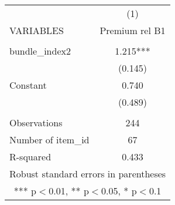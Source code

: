 \documentclass[]{article}
\begin{document}
\begin{tabular}{lc} \hline
 & (1) \\
VARIABLES & Premium rel B1 \\ \hline
 &  \\
bundle\_index2 & 1.215*** \\
 & (0.145) \\
Constant & 0.740 \\
 & (0.489) \\
 &  \\
Observations & 244 \\
Number of item\_id & 67 \\
 R-squared & 0.433 \\ \hline
\multicolumn{2}{c}{ Robust standard errors in parentheses} \\
\multicolumn{2}{c}{ *** p$<$0.01, ** p$<$0.05, * p$<$0.1} \\
\end{tabular}
\end{document}
